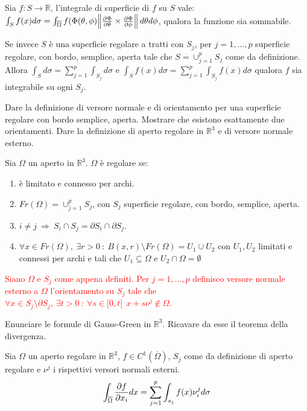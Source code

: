 \documentclass{exam}
\newcommand{\R}[0]{\mathbb{R}}
\newcommand{\err}[1]{\textcolor{red}{#1}}
\begin{document}
\begin{questions}
\begin{solution}
Sia $f: S \to \R$, l'integrale di superficie di $f$ su $S$ vale: $\int_{S}f(x) d\sigma = \int_{\overline{\Omega}} f(\Phi(\theta, \phi)\norm{\pdv{\Phi}{\theta} \times \pdv{\Phi}{\phi}} d\theta d\phi$, qualora la funzione sia sommabile.

Se invece $S$ è una superficie regolare a tratti con $S_j$, per $j=1 ,\dots, p $ superficie regolare, con bordo, semplice, aperta tale che $S = \cup_{j=1}^p S_j$ come da definizione.
Allora $\int_S d\sigma = \sum_{j=1}^p \int_{S_j} d\sigma$ e $\int_S f(x) d\sigma = \sum_{j=1}^p \int_{S_j} f(x) d\sigma$ qualora $f$ sia integrabile su ogni $S_j$.
\end{solution}

\question Dare la definizione di versore normale e di orientamento per una superficie regolare con bordo semplice, aperta. Mostrare che esistono esattamente due orientamenti.
\question Dare la definizione di aperto regolare in $\R^3$ e di versore normale esterno.

\begin{solution}
    Sia $\Omega$ un aperto in $\R^3$. $\Omega$ è regolare se:
    \begin{enumerate}
        \item è limitato e connesso per archi.
        \item $Fr(\Omega) = \cup_{j=1}^p S_j$, con $S_j$ superficie regolare, con bordo, semplice, aperta.
        \item $i \not= j \ \Longrightarrow\  S_i \cap S_j = \partial S_i \cap \partial S_j$.
        \item $\forall x \in Fr(\Omega), \ \exists r>0 \ : \ B(x,r) \setminus Fr(\Omega) = U_1 \cup U_2$ con $U_1, U_2$ limitati e connessi per archi e tali che $U_1 \subseteq \Omega$ e $U_2 \cap \Omega = \emptyset$
    \end{enumerate}

\err{
Siano $\Omega$ e $S_j$ come appena definiti. Per $j=1,\dots,p$ definisco versore normale esterno a $\Omega$ l'orientamento su $S_j$ tale che $\forall x \in S_j \setminus \partial S_j, \ \exists t>0 \ : \ \forall s \in [0,t[ \ \  x+s\nu^j \not\in \Omega$.
}
\end{solution}

\question Enunciare le formule di Gauss-Green in $\R^3$. Ricavare da esse il teorema della divergenza.

\begin{solution}
    Sia $\Omega$ un aperto regolare in $\R^3$, $f\in C^1(\overline{\Omega})$, $S_j$ come da definizione di aperto regolare e $\nu^j$ i rispettivi versori normali esterni. 
    \[
    \int_{\overline{\Omega}} \pdv{f}{x_i} dx = \sum_{j=1}^p\int_{s_j} f(x) \nu^j_i d \sigma
    \]
    

\end{solution}
\end{questions}
\end{document}
